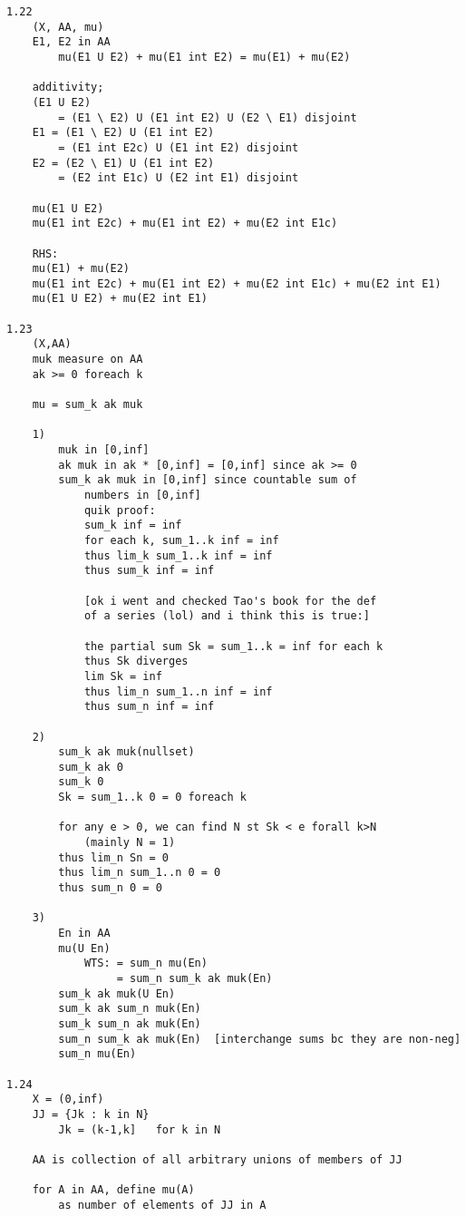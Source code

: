 \documentclass{article}
\begin{document}
\begin{flushleft}
\begin{verbatim}
1.22
    (X, AA, mu)
    E1, E2 in AA 
        mu(E1 U E2) + mu(E1 int E2) = mu(E1) + mu(E2)

    additivity;
    (E1 U E2) 
        = (E1 \ E2) U (E1 int E2) U (E2 \ E1) disjoint
    E1 = (E1 \ E2) U (E1 int E2)
        = (E1 int E2c) U (E1 int E2) disjoint 
    E2 = (E2 \ E1) U (E1 int E2)
        = (E2 int E1c) U (E2 int E1) disjoint 

    mu(E1 U E2)
    mu(E1 int E2c) + mu(E1 int E2) + mu(E2 int E1c)

    RHS: 
    mu(E1) + mu(E2) 
    mu(E1 int E2c) + mu(E1 int E2) + mu(E2 int E1c) + mu(E2 int E1)
    mu(E1 U E2) + mu(E2 int E1)

1.23
    (X,AA)
    muk measure on AA 
    ak >= 0 foreach k 

    mu = sum_k ak muk 

    1)
        muk in [0,inf]
        ak muk in ak * [0,inf] = [0,inf] since ak >= 0
        sum_k ak muk in [0,inf] since countable sum of 
            numbers in [0,inf] 
            quik proof:
            sum_k inf = inf 
            for each k, sum_1..k inf = inf 
            thus lim_k sum_1..k inf = inf 
            thus sum_k inf = inf 

            [ok i went and checked Tao's book for the def
            of a series (lol) and i think this is true:]

            the partial sum Sk = sum_1..k = inf for each k 
            thus Sk diverges 
            lim Sk = inf 
            thus lim_n sum_1..n inf = inf 
            thus sum_n inf = inf 

    2)
        sum_k ak muk(nullset)
        sum_k ak 0
        sum_k 0 
        Sk = sum_1..k 0 = 0 foreach k 
        
        for any e > 0, we can find N st Sk < e forall k>N
            (mainly N = 1)
        thus lim_n Sn = 0             
        thus lim_n sum_1..n 0 = 0 
        thus sum_n 0 = 0

    3)
        En in AA
        mu(U En)
            WTS: = sum_n mu(En)
                 = sum_n sum_k ak muk(En) 
        sum_k ak muk(U En)
        sum_k ak sum_n muk(En)
        sum_k sum_n ak muk(En)
        sum_n sum_k ak muk(En)  [interchange sums bc they are non-neg]
        sum_n mu(En)

1.24
    X = (0,inf)
    JJ = {Jk : k in N}
        Jk = (k-1,k]   for k in N 
    
    AA is collection of all arbitrary unions of members of JJ

    for A in AA, define mu(A) 
        as number of elements of JJ in A


\end{verbatim}
\end{flushleft}
\end{document}
